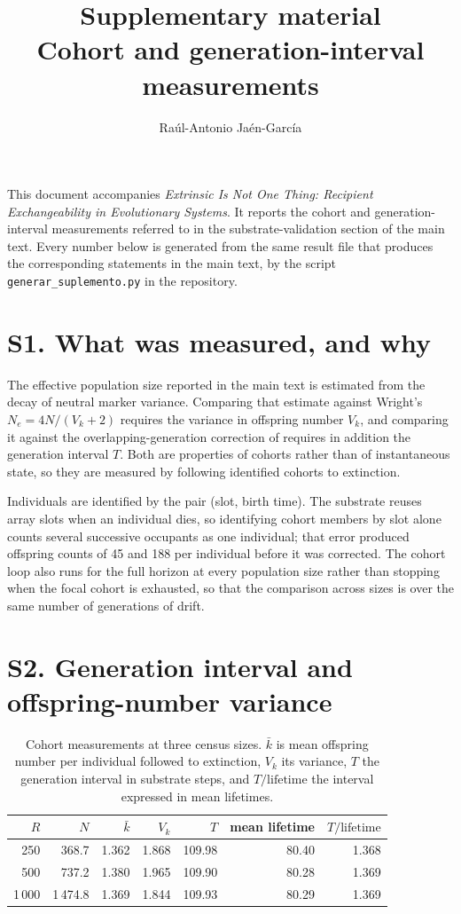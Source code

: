 \documentclass[11pt]{article}
\title{Supplementary material\\[2pt]\large Cohort and
generation-interval measurements}
\author{Ra\'ul-Antonio Ja\'en-Garc\'ia}
\date{}
\begin{document}
\maketitle

\noindent This document accompanies \emph{Extrinsic Is Not One Thing:
Recipient Exchangeability in Evolutionary Systems}. It reports the
cohort and generation-interval measurements referred to in the
substrate-validation section of the main text. Every number below is
generated from the same result file that produces the corresponding
statements in the main text, by the script
\texttt{generar\_suplemento.py} in the repository.

\section*{S1. What was measured, and why}

The effective population size reported in the main text is estimated
from the decay of neutral marker variance. Comparing that estimate
against Wright's $N_e = 4N/(V_k+2)$ requires the variance in offspring
number $V_k$, and comparing it against the overlapping-generation
correction of \citet{hill1972} requires in addition the generation
interval $T$.
Both are properties of cohorts rather than of instantaneous state, so
they are measured by following identified cohorts to extinction.

Individuals are identified by the pair (slot, birth time). The
substrate reuses array slots when an individual dies, so identifying
cohort members by slot alone counts several successive occupants as
one individual; that error produced offspring counts of 45 and 188 per
individual before it was corrected. The cohort loop also runs for the
full horizon at every population size rather than stopping when the
focal cohort is exhausted, so that the comparison across sizes is over
the same number of generations of drift.

\section*{S2. Generation interval and offspring-number variance}

\begin{table}[ht]
\centering\small
\caption{Cohort measurements at three census sizes. $\bar{k}$ is mean
offspring number per individual followed to extinction, $V_k$ its
variance, $T$ the generation interval in substrate steps, and
$T/\mathrm{lifetime}$ the interval expressed in mean lifetimes.}
\label{tab:s_cohortes}
\begin{tabular}{rrrrrrr}
\toprule
$R$ & $N$ & $\bar{k}$ & $V_k$ & $T$ & mean lifetime & $T/\mathrm{lifetime}$\\
\midrule
250 & 368.7 & 1.362 & 1.868 & 109.98 & 80.40 & 1.368\\
500 & 737.2 & 1.380 & 1.965 & 109.90 & 80.28 & 1.369\\
1\,000 & 1\,474.8 & 1.369 & 1.844 & 109.93 & 80.29 & 1.369\\
\bottomrule
\end{tabular}
\end{table}
\end{document}
